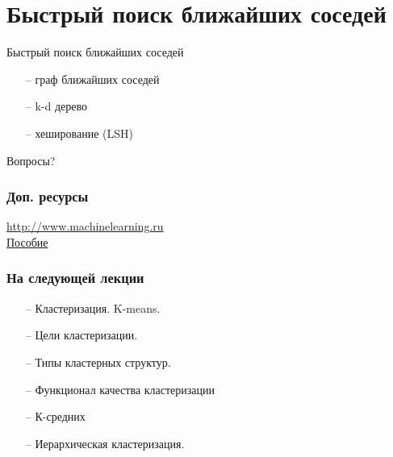 \documentclass[10pt]{beamer}
\begin{document}
\section{Быстрый поиск ближайших соседей}

\begin{frame}{Быстрый поиск ближайших соседей}
	\begin{itemize}
		\item[--] граф ближайших соседей
		\item[--] k-d дерево
		\item[--] хеширование (LSH)
	\end{itemize}
\end{frame}

\begin{frame}[standout]
  Вопросы?
\end{frame}

\appendix


	
	

\begin{frame}\frametitle{Доп. ресурсы}
	\href{http://www.machinelearning.ru}{http://www.machinelearning.ru}\\
	\bigbreak
	\href{http://www.machinelearning.ru/wiki/images/6/6d/Voron-ML-1.pdf}{Пособие}
\end{frame}


\begin{frame}\frametitle{На следующей лекции}
	\begin{itemize}
		\item[--] Кластеризация.  K-means.
		\item[--] Цели кластеризации.
		\item[--] Типы кластерных структур.
		\item[--] Функционал качества кластеризации
		\item[--] К-средних
		\item[--] Иерархическая кластеризация.
	\end{itemize}
\end{frame}
\end{document}
